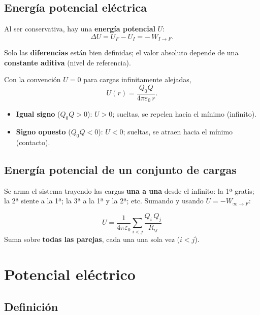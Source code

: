 \documentclass[12pt,a4paper]{article}
\begin{document}
\subsection{Energía potencial eléctrica}

Al ser conservativa, hay una \textbf{energía potencial} $U$:
\[
\Delta U = U_F - U_I = -\,W_{I\to F}.
\]

Solo las \textbf{diferencias} están bien definidas; el valor absoluto
depende de una \textbf{constante aditiva} (nivel de referencia).

\begin{keybox}
  Con la convención $U=0$ para cargas infinitamente alejadas,
  \[
  \boxed{U(r) = \frac{Q_0 Q}{4\pi\varepsilon_0\, r}} .
  \]
\end{keybox}

\begin{itemize}[nosep]
  \item \textbf{Igual signo} ($Q_0 Q>0$): $U>0$; sueltas, se repelen
        hacia el mínimo (infinito).
  \item \textbf{Signo opuesto} ($Q_0 Q<0$): $U<0$; sueltas, se atraen
        hacia el mínimo (contacto).
\end{itemize}

\subsection{Energía potencial de un conjunto de cargas}

Se arma el sistema trayendo las cargas \textbf{una a una} desde el
infinito: la 1ª gratis; la 2ª siente a la 1ª; la 3ª a la 1ª y la 2ª;
etc. Sumando y usando $U=-W_{\infty\to F}$:

\begin{keybox}
  \[
  \boxed{U = \frac{1}{4\pi\varepsilon_0}\sum_{i<j}\frac{Q_i\,Q_j}{R_{ij}}}
  \]
  Suma sobre \textbf{todas las parejas}, cada una una sola vez
  ($i<j$).
\end{keybox}

\section{Potencial eléctrico}

\subsection{Definición}
\end{document}
